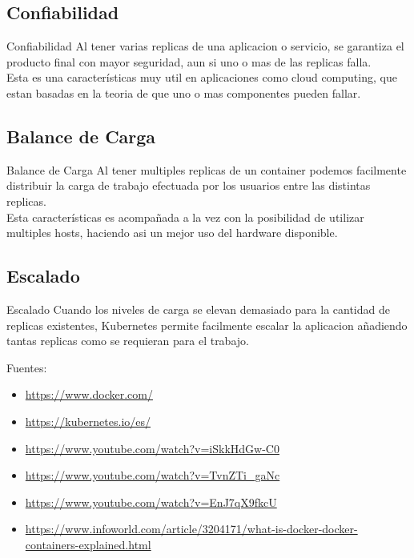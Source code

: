 \documentclass{beamer}
\begin{document}
\subsection{Confiabilidad}

\begin{frame}{Confiabilidad}
	Al tener varias replicas de una aplicacion o servicio, se garantiza el producto final con mayor seguridad, aun si uno o mas de las replicas falla. \\
	\vspace{.3cm}
	Esta es una características muy util en aplicaciones como cloud computing, que estan basadas en la teoria de que uno o mas componentes pueden fallar.
\end{frame}


\subsection{Balance de Carga}

\begin{frame}{Balance de Carga}
	Al tener multiples replicas de un container podemos facilmente distribuir la carga de trabajo efectuada por los usuarios entre las distintas replicas. \\
	\vspace{.3cm}
	Esta características es acompañada a la vez con la posibilidad de utilizar multiples hosts, haciendo asi un mejor uso del hardware disponible.
\end{frame}


\subsection{Escalado}

\begin{frame}{Escalado}
	\hspace{.3cm}Cuando los niveles de carga se elevan demasiado para la cantidad de replicas existentes, Kubernetes permite facilmente escalar la aplicacion
	añadiendo tantas replicas como se requieran para el trabajo.
\end{frame}

\begin{frame}
	Fuentes:
	\begin{itemize}
	\item
	\url{https://www.docker.com/}
	\item
	\url{https://kubernetes.io/es/}
	\item
	\url{https://www.youtube.com/watch?v=iSkkHdGw-C0}
	\item
	\url{https://www.youtube.com/watch?v=TvnZTi_gaNc}
	\item
	\url{https://www.youtube.com/watch?v=EnJ7qX9fkcU}
	\item
	\url{https://www.infoworld.com/article/3204171/what-is-docker-docker-containers-explained.html}
	\end{itemize}
\end{frame}
\end{document}
